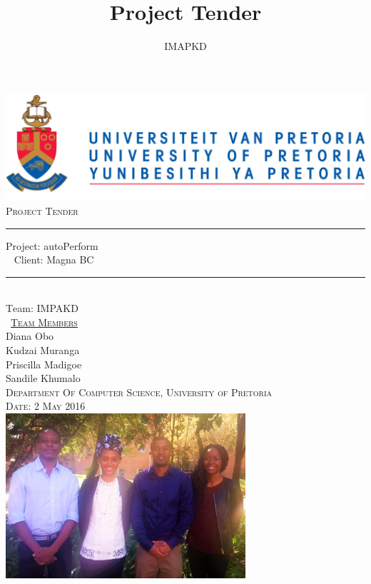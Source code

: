 \documentclass[a4paper,12pt]{article}
\author{IMAPKD}
\title{ Project Tender}
\begin{document}
\setlength{\parskip}{6pt}

\begin{titlepage}

\begin{center}
\includegraphics[width=1\textwidth]{./University_of_Pretoria_Logo.PNG}\\[0.4cm]    
\textsc{\Large Project Tender}\\[0.5cm]

\rule{15cm}{0.5pt}

{ \huge \textsc Project: autoPerform }\\[0.4cm]\
{ \huge \textsc Client: Magna BC  }

\rule{15cm}{0.4pt}
\\[0.5cm]
{ \huge \textsc Team: IMPAKD  }\\[0.5cm]\
\textsc{\Large\underline{Team Members}}\\[0.5cm]

{\Large Diana {Obo}} \\[0.3cm]

{\Large Kudzai {Muranga}} \\[0.3cm]

{\Large Priscilla {Madigoe}}\\[0.3cm]

{\Large Sandile {Khumalo}}\\[0.5cm]

\textsc{ Department Of Computer Science, University of Pretoria}\\[0.3cm]
\textsc{Date: 2 May 2016}\\[0.3cm]

\includegraphics[width=3.5in]{./IMAPKD.jpg}

\vfill
\end{center}
\end{titlepage}
\end{document}

